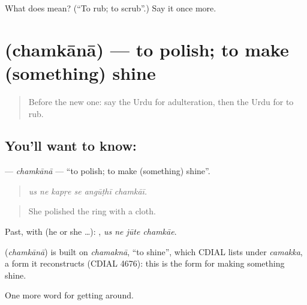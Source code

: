 \begin{tcolorbox}[breakable,colback=teal!4,colframe=teal!35!black,title={Before you move on}]
What does  mean? (\textquotedblleft{}To rub; to scrub\textquotedblright{}.) Say it once more.
\end{tcolorbox}
\section[\texorpdfstring{\ur{چمکانا} (chamkānā)}{چمکانا (chamkānā)}]{ (chamkānā) — to polish; to make (something) shine}

\label{lesson:UR-C426-chamkana}



\begin{quote}
Before the new one: say the Urdu for adulteration, then the Urdu for to rub.
\end{quote}

\subsection*{You'll want to know: }
\textbf{} — \emph{chamkānā} — \textquotedblleft{}to polish; to make (something) shine\textquotedblright{}.

\begin{quote}
     
\end{quote}

\begin{quote}
\emph{us ne kapṛe se angūṭhī chamkāī.}
\end{quote}

\begin{quote}
She polished the ring with a cloth.
\end{quote}

Past, with  (he or she …):    , \emph{us ne jūte chamkāe}.

\begin{cousinweb}
\textbf{} (\emph{chamkānā}) is built on \emph{chamaknā}, \textquotedblleft{}to shine\textquotedblright{}, which CDIAL lists under \emph{camakka}, a form it reconstructs (CDIAL 4676): this is the form for making something shine.
\end{cousinweb}

\begin{grammarlens}[title={What you've built}]
One more word for getting around.
\end{grammarlens}

